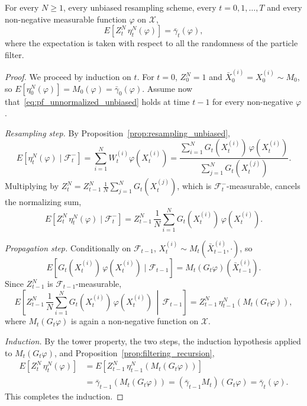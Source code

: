 \begin{lemma}
    \label{lem:pf_unnormalized_unbiased}
    For every $N\ge1$, every unbiased resampling scheme, every $t=0,1,\ldots,T$ and every non-negative measurable function $\varphi$ on $\mathcal{X}$,
    \begin{equation}
        E\left[Z_t^N\,\eta_t^N(\varphi)\right] = \bar{\gamma}_t(\varphi),
        \label{eq:pf_unnormalized_unbiased}
    \end{equation}
    where the expectation is taken with respect to all the randomness of the particle filter.
\end{lemma}
\begin{proof}
    We proceed by induction on $t$. For $t=0$, $Z_0^N = 1$ and $\bar{X}_0^{(i)} = X_0^{(i)}\sim M_0$, so $E[\eta_0^N(\varphi)] = M_0(\varphi) = \bar{\gamma}_0(\varphi)$. Assume now that~\eqref{eq:pf_unnormalized_unbiased} holds at time $t-1$ for every non-negative $\varphi$.

    \emph{Resampling step.} By Proposition~\ref{prop:resampling_unbiased},
    \begin{equation}
        E\left[\eta_t^N(\varphi)\mid\mathcal{F}_t^-\right] = \sum_{i=1}^{N}W_t^{(i)}\varphi(X_t^{(i)}) = \frac{\sum_{i=1}^{N}G_t(X_t^{(i)})\,\varphi(X_t^{(i)})}{\sum_{j=1}^{N}G_t(X_t^{(j)})}.
    \end{equation}
    Multiplying by $Z_t^N = Z_{t-1}^N\,\frac{1}{N}\sum_{j=1}^{N}G_t(X_t^{(j)})$, which is $\mathcal{F}_t^-$-measurable, cancels the normalizing sum,
    \begin{equation}
        E\left[Z_t^N\,\eta_t^N(\varphi)\mid\mathcal{F}_t^-\right] = Z_{t-1}^N\,\frac{1}{N}\sum_{i=1}^{N}G_t(X_t^{(i)})\,\varphi(X_t^{(i)}).
    \end{equation}

    \emph{Propagation step.} Conditionally on $\mathcal{F}_{t-1}$, $X_t^{(i)}\sim M_t(\bar{X}_{t-1}^{(i)},\cdot)$, so
    \begin{equation}
        E\left[G_t(X_t^{(i)})\,\varphi(X_t^{(i)})\mid\mathcal{F}_{t-1}\right] = M_t(G_t\varphi)(\bar{X}_{t-1}^{(i)}).
    \end{equation}
    Since $Z_{t-1}^N$ is $\mathcal{F}_{t-1}$-measurable,
    \begin{equation}
        E\left[Z_{t-1}^N\,\frac{1}{N}\sum_{i=1}^{N}G_t(X_t^{(i)})\,\varphi(X_t^{(i)})\,\middle|\,\mathcal{F}_{t-1}\right] = Z_{t-1}^N\,\eta_{t-1}^N\left(M_t(G_t\varphi)\right),
    \end{equation}
    where $M_t(G_t\varphi)$ is again a non-negative function on $\mathcal{X}$.

    \emph{Induction.} By the tower property, the two steps, the induction hypothesis applied to $M_t(G_t\varphi)$, and Proposition~\ref{prop:filtering_recursion},
    \begin{align}
        E\left[Z_t^N\,\eta_t^N(\varphi)\right] &= E\left[Z_{t-1}^N\,\eta_{t-1}^N\left(M_t(G_t\varphi)\right)\right] \\
        &= \bar{\gamma}_{t-1}\left(M_t(G_t\varphi)\right) = (\bar{\gamma}_{t-1}M_t)(G_t\varphi) = \bar{\gamma}_t(\varphi).
    \end{align}
    This completes the induction.
\end{proof}

